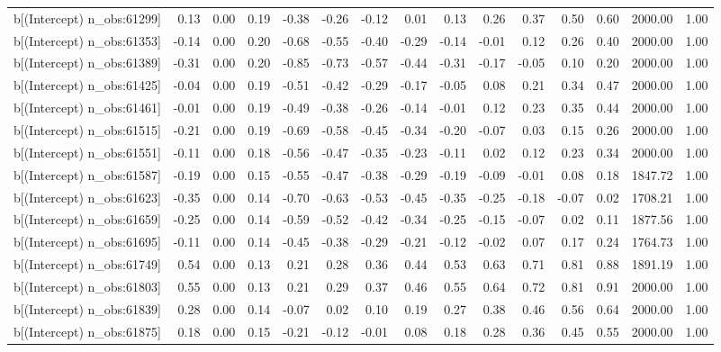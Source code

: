 \begin{table}[ht]
\begin{tabular}{rrrrrrrrrrrrrrr}
  b[(Intercept) n\_obs:61299] & 0.13 & 0.00 & 0.19 & -0.38 & -0.26 & -0.12 & 0.01 & 0.13 & 0.26 & 0.37 & 0.50 & 0.60 & 2000.00 & 1.00 \\ 
  b[(Intercept) n\_obs:61353] & -0.14 & 0.00 & 0.20 & -0.68 & -0.55 & -0.40 & -0.29 & -0.14 & -0.01 & 0.12 & 0.26 & 0.40 & 2000.00 & 1.00 \\ 
  b[(Intercept) n\_obs:61389] & -0.31 & 0.00 & 0.20 & -0.85 & -0.73 & -0.57 & -0.44 & -0.31 & -0.17 & -0.05 & 0.10 & 0.20 & 2000.00 & 1.00 \\ 
  b[(Intercept) n\_obs:61425] & -0.04 & 0.00 & 0.19 & -0.51 & -0.42 & -0.29 & -0.17 & -0.05 & 0.08 & 0.21 & 0.34 & 0.47 & 2000.00 & 1.00 \\ 
  b[(Intercept) n\_obs:61461] & -0.01 & 0.00 & 0.19 & -0.49 & -0.38 & -0.26 & -0.14 & -0.01 & 0.12 & 0.23 & 0.35 & 0.44 & 2000.00 & 1.00 \\ 
  b[(Intercept) n\_obs:61515] & -0.21 & 0.00 & 0.19 & -0.69 & -0.58 & -0.45 & -0.34 & -0.20 & -0.07 & 0.03 & 0.15 & 0.26 & 2000.00 & 1.00 \\ 
  b[(Intercept) n\_obs:61551] & -0.11 & 0.00 & 0.18 & -0.56 & -0.47 & -0.35 & -0.23 & -0.11 & 0.02 & 0.12 & 0.23 & 0.34 & 2000.00 & 1.00 \\ 
  b[(Intercept) n\_obs:61587] & -0.19 & 0.00 & 0.15 & -0.55 & -0.47 & -0.38 & -0.29 & -0.19 & -0.09 & -0.01 & 0.08 & 0.18 & 1847.72 & 1.00 \\ 
  b[(Intercept) n\_obs:61623] & -0.35 & 0.00 & 0.14 & -0.70 & -0.63 & -0.53 & -0.45 & -0.35 & -0.25 & -0.18 & -0.07 & 0.02 & 1708.21 & 1.00 \\ 
  b[(Intercept) n\_obs:61659] & -0.25 & 0.00 & 0.14 & -0.59 & -0.52 & -0.42 & -0.34 & -0.25 & -0.15 & -0.07 & 0.02 & 0.11 & 1877.56 & 1.00 \\ 
  b[(Intercept) n\_obs:61695] & -0.11 & 0.00 & 0.14 & -0.45 & -0.38 & -0.29 & -0.21 & -0.12 & -0.02 & 0.07 & 0.17 & 0.24 & 1764.73 & 1.00 \\ 
  b[(Intercept) n\_obs:61749] & 0.54 & 0.00 & 0.13 & 0.21 & 0.28 & 0.36 & 0.44 & 0.53 & 0.63 & 0.71 & 0.81 & 0.88 & 1891.19 & 1.00 \\ 
  b[(Intercept) n\_obs:61803] & 0.55 & 0.00 & 0.13 & 0.21 & 0.29 & 0.37 & 0.46 & 0.55 & 0.64 & 0.72 & 0.81 & 0.91 & 2000.00 & 1.00 \\ 
  b[(Intercept) n\_obs:61839] & 0.28 & 0.00 & 0.14 & -0.07 & 0.02 & 0.10 & 0.19 & 0.27 & 0.38 & 0.46 & 0.56 & 0.64 & 2000.00 & 1.00 \\ 
  b[(Intercept) n\_obs:61875] & 0.18 & 0.00 & 0.15 & -0.21 & -0.12 & -0.01 & 0.08 & 0.18 & 0.28 & 0.36 & 0.45 & 0.55 & 2000.00 & 1.00 \\ 

\end{tabular}
\end{table}
